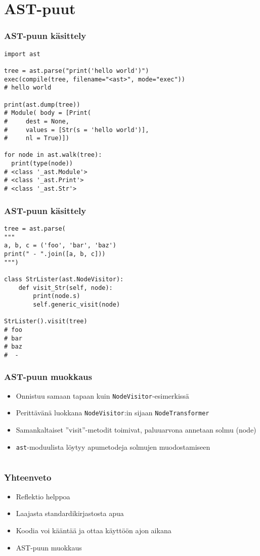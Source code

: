 \documentclass{beamer}
\begin{document}
\section{AST-puut}


\begin{frame}[fragile]
\frametitle{AST-puun käsittely}
\begin{verbatim}
import ast

tree = ast.parse("print('hello world')")
exec(compile(tree, filename="<ast>", mode="exec"))
# hello world

print(ast.dump(tree))
# Module( body = [Print(
#     dest = None, 
#     values = [Str(s = 'hello world')], 
#     nl = True)])

for node in ast.walk(tree):
  print(type(node))
# <class '_ast.Module'>
# <class '_ast.Print'>
# <class '_ast.Str'>

\end{verbatim}
\end{frame}


\begin{frame}[fragile]
\frametitle{AST-puun käsittely}
\begin{verbatim}
tree = ast.parse(
"""
a, b, c = ('foo', 'bar', 'baz')
print(" - ".join([a, b, c]))
""")

class StrLister(ast.NodeVisitor):
    def visit_Str(self, node):
        print(node.s)
        self.generic_visit(node)

StrLister().visit(tree)
# foo
# bar
# baz
#  - 
\end{verbatim}
\end{frame}


\begin{frame}[fragile]
\frametitle{AST-puun muokkaus}
\begin{itemize}
\item{Onnistuu samaan tapaan kuin \verb|NodeVisitor|-esimerkissä}
\item{Perittävänä luokkana \verb|NodeVisitor|:in sijaan \verb|NodeTransformer|}
\item{Samankaltaiset ''visit''-metodit toimivat, paluuarvona annetaan solmu (node)}
\item{\verb|ast|-moduulista löytyy apumetodeja solmujen muodostamiseen}
\end{itemize}
\end{frame}


\section{}

\begin{frame}[fragile]
  \frametitle{Yhteenveto}
\begin{itemize}
\item{Reflektio helppoa}
\item{Laajasta standardikirjastosta apua}
\item{Koodia voi kääntää ja ottaa käyttöön ajon aikana}
\item{AST-puun muokkaus}
\end{itemize}
\end{frame}
\end{document}
